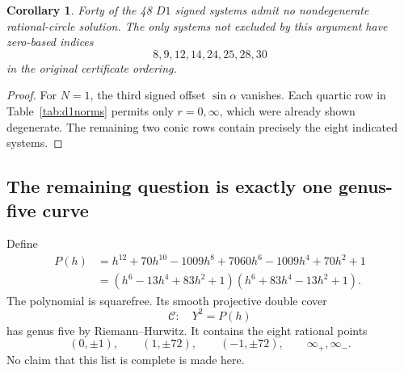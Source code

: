 \documentclass[11pt,letterpaper]{article}
\newtheorem{corollary}[theorem]{Corollary}
\theoremstyle{definition}\newtheorem{definition}[theorem]{Definition}
\theoremstyle{remark}\newtheorem{remark}[theorem]{Remark}
\begin{document}
\begin{corollary}\label{cor:d1forty}
Forty of the 48 $D1$ signed systems admit no nondegenerate rational-circle solution. The only systems not excluded by this argument have zero-based indices
\[
 8,9,12,14,24,25,28,30
\]
in the original certificate ordering.
\end{corollary}
\begin{proof}
For $N=1$, the third signed offset $\sin\alpha$ vanishes. Each quartic row in Table~\ref{tab:d1norms} permits only $r=0,\infty$, which were already shown degenerate. The remaining two conic rows contain precisely the eight indicated systems.
\end{proof}

\subsection{The remaining question is exactly one genus-five curve}
Define
\begin{align}
 P(h)&=h^{12}+70h^{10}-1009h^8+7060h^6-1009h^4+70h^2+1\label{eq:d1P}\\
 &= (h^6-13h^4+83h^2+1)(h^6+83h^4-13h^2+1).\nonumber
\end{align}
The polynomial is squarefree. Its smooth projective double cover
\[
 \mathcal C:\quad Y^2=P(h)
\]
has genus five by Riemann--Hurwitz. It contains the eight rational points
\begin{equation}\label{eq:d1known}
 (0,\pm1),\qquad(1,\pm72),\qquad(-1,\pm72),\qquad\infty_+,\infty_-.
\end{equation}
No claim that this list is complete is made here.
\end{document}
